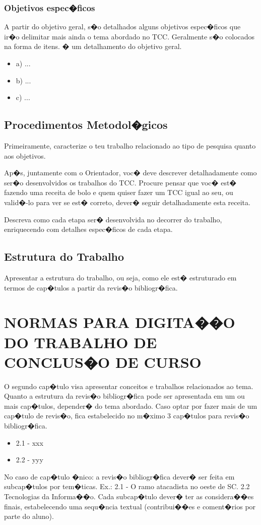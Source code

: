 \documentclass[pnumromarab, normaltoc, a4paper, 12pt]{abnt}
\begin{document}
\subsection{Objetivos espec�ficos}
A partir do objetivo geral, s�o detalhados alguns objetivos espec�ficos que ir�o
delimitar mais ainda o tema abordado no TCC. Geralmente s�o colocados na forma
de itens. � um detalhamento do objetivo geral.

\begin{itemize}
  \leading{5mm}
  \item [] a) ...
  \item [] b) ...
  \item [] c) ...
\end{itemize}

\section{Procedimentos Metodol�gicos}
Primeiramente, caracterize o teu trabalho relacionado ao tipo de pesquisa quanto
aos objetivos.

Ap�s, juntamente com o Orientador, voc� deve descrever detalhadamente como ser�o
desenvolvidos os trabalhos do TCC. Procure pensar que voc� est� fazendo uma
receita de bolo e quem quiser fazer um TCC igual ao seu, ou valid�-lo para ver
se est� correto, dever� seguir detalhadamente esta receita.

Descreva como cada etapa ser� desenvolvida no decorrer do trabalho, enriquecendo
com detalhes espec�ficos de cada etapa.

\section{Estrutura do Trabalho}
Apresentar a estrutura do trabalho, ou seja, como ele est� estruturado em
termos de cap�tulos a partir da revis�o bibliogr�fica.

\chapter{NORMAS PARA DIGITA��O DO TRABALHO DE CONCLUS�O DE CURSO}
O segundo cap�tulo visa apresentar conceitos e trabalhos relacionados ao tema.
Quanto a estrutura da revis�o bibliogr�fica pode ser apresentada em um ou mais
cap�tulos, depender� do tema abordado. Caso optar por fazer mais de um cap�tulo
de revis�o, fica estabelecido no m�ximo 3 cap�tulos para revis�o bibliogr�fica.
\begin{itemize}
  \leading{5mm}
  \item [] 2.1 - xxx
  \item [] 2.2 - yyy
\end{itemize}
No caso de cap�tulo �nico: a revis�o bibliogr�fica dever� ser feita em
subcap�tulos por tem�ticas. Ex.: 2.1 - O ramo atacadista no oeste de SC. 2.2
Tecnologias da Informa��o. Cada subcap�tulo dever� ter as considera��es finais,
estabelecendo uma sequ�ncia textual (contribui��es e coment�rios por parte do
aluno).
\end{document}
